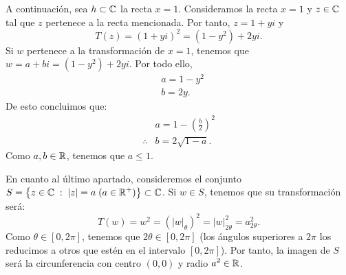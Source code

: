 \documentclass{article}
\begin{document}
\begin{sol}
\begin{center}
\end{center}

A continuación, sea $\displaystyle h \subset \mathbb{C} $ la recta $\displaystyle x=1 $. Consideramos la recta $\displaystyle x = 1 $ y $\displaystyle z \in \mathbb{C} $ tal que $\displaystyle z $ pertenece a la recta mencionada. Por tanto, $\displaystyle z = 1 + yi $ y 
\[T\left(z\right) = \left(1+yi\right)^{2} = \left(1-y^{2}\right) + 2yi .\]
Si $\displaystyle w $ pertenece a la transformación de $\displaystyle x = 1 $, tenemos que $\displaystyle w = a + bi = \left(1-y^{2}\right) + 2yi $. Por todo ello,
\[
\begin{split}
& a = 1 - y^{2} \\
& b = 2y.
\end{split}
\]
De esto concluimos que:
\[
\begin{split}
& a = 1 - \left(\frac{b}{2}\right)^{2} \\
\therefore & b = 2\sqrt{1-a}.
\end{split}
\]
Como $\displaystyle a,b \in \mathbb{R} $, tenemos que $\displaystyle a \leq 1 $. \\ 
\begin{center}
\end{center}
En cuanto al último apartado, consideremos el conjunto $\displaystyle S =\left\{ z \in \mathbb{C} \; : \; \left|z\right| = a \; (a \in \mathbb{R}^{+})\right\}\subset \mathbb{C} $. Si $\displaystyle w \in S $, tenemos que su transformación será:
\[T\left(w\right) = w ^{2} = \left(|w|_{\theta}\right)^{2}= \left|w\right|^{2}_{2\theta}=a^{2}_{2\theta} .\]
Como $\displaystyle \theta \in \left[0,2\pi\right]  $, tenemos que $\displaystyle 2\theta \in \left[0,2\pi\right]  $ (los ángulos superiores a $\displaystyle 2\pi $ los reducimos a otros que estén en el intervalo $\displaystyle \left[0,2\pi\right]  $). Por tanto, la imagen de $\displaystyle S $ será la circunferencia con centro $\displaystyle \left(0,0\right) $ y radio $\displaystyle a^{2} \in \mathbb{R} $.  
\end{sol}
\end{document}
